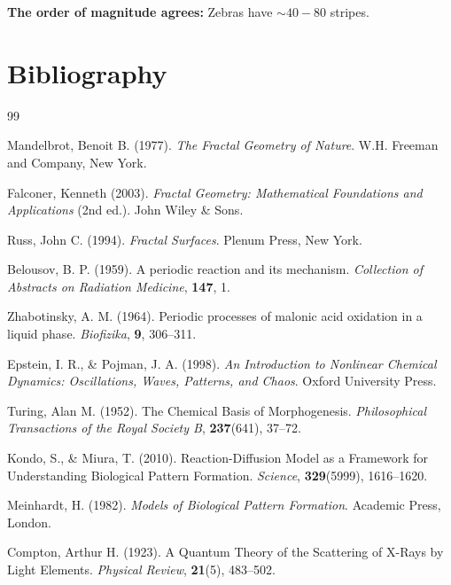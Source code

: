 	\textbf{The order of magnitude agrees:} Zebras have $\sim 40-80$ stripes.
	
	\section*{Bibliography}
	
	\begin{thebibliography}{99}
		
		Mandelbrot, Benoit B. (1977). \textit{The Fractal Geometry of Nature}. 
		W.H. Freeman and Company, New York.
		
		Falconer, Kenneth (2003). \textit{Fractal Geometry: Mathematical Foundations and Applications} (2nd ed.). 
		John Wiley \& Sons.
		
		Russ, John C. (1994). \textit{Fractal Surfaces}. 
		Plenum Press, New York.
		
		Belousov, B. P. (1959). A periodic reaction and its mechanism. 
		\textit{Collection of Abstracts on Radiation Medicine}, \textbf{147}, 1.
		
		Zhabotinsky, A. M. (1964). Periodic processes of malonic acid oxidation in a liquid phase. 
		\textit{Biofizika}, \textbf{9}, 306--311.
		
		Epstein, I. R., \& Pojman, J. A. (1998). \textit{An Introduction to Nonlinear Chemical Dynamics: Oscillations, Waves, Patterns, and Chaos}. 
		Oxford University Press.
		
		Turing, Alan M. (1952). The Chemical Basis of Morphogenesis. 
		\textit{Philosophical Transactions of the Royal Society B}, \textbf{237}(641), 37--72.
		
		Kondo, S., \& Miura, T. (2010). Reaction-Diffusion Model as a Framework for Understanding Biological Pattern Formation. 
		\textit{Science}, \textbf{329}(5999), 1616--1620.
		
		Meinhardt, H. (1982). \textit{Models of Biological Pattern Formation}. 
		Academic Press, London.
		
		Compton, Arthur H. (1923). A Quantum Theory of the Scattering of X-Rays by Light Elements. 
		\textit{Physical Review}, \textbf{21}(5), 483--502.
		

\end{thebibliography}
